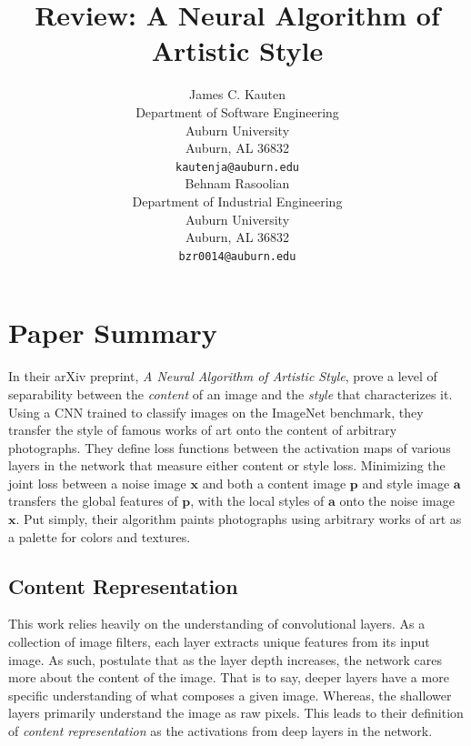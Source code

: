 \documentclass{article}
\begin{document}
\title{Review: A Neural Algorithm of Artistic Style}


\author{
    James C. Kauten \\
    Department of Software Engineering \\
    Auburn University \\
    Auburn, AL 36832 \\
    \texttt{kautenja@auburn.edu} \\
    \And
    Behnam Rasoolian \\
    Department of Industrial Engineering \\
    Auburn University \\
    Auburn, AL 36832 \\
    \texttt{bzr0014@auburn.edu} \\
}

\maketitle

\section{Paper Summary}

In their arXiv preprint, \textit{A Neural Algorithm of Artistic Style},
\cite{2015arXiv150806576G} prove a level of separability between the
\textit{content} of an image and the \textit{style} that characterizes it.
Using a \ac{CNN} trained to classify images on the ImageNet benchmark, they
transfer the style of famous works of art onto the content of arbitrary
photographs. They define loss functions between the activation maps of
various layers in the network that measure either content or style loss.
Minimizing the joint loss between a noise image $\textbf{x}$ and both a
content image $\textbf{p}$ and style image $\textbf{a}$ transfers the global
features of $\textbf{p}$, with the local styles of $\textbf{a}$ onto the
noise image $\textbf{x}$. Put simply, their algorithm paints photographs using
arbitrary works of art as a palette for colors and textures.


\subsection{Content Representation}

This work relies heavily on the understanding of convolutional layers. As a
collection of image filters, each layer extracts unique features from its
input image. As such, \cite{2015arXiv150806576G} postulate that as the layer
depth increases, the network cares more about the content of the image. That
is to say, deeper layers have a more specific understanding of what composes
a given image. Whereas, the shallower layers primarily understand the image
as raw pixels. This leads to their definition of \textit{content
representation} as the activations from deep layers in the network.
\end{document}
